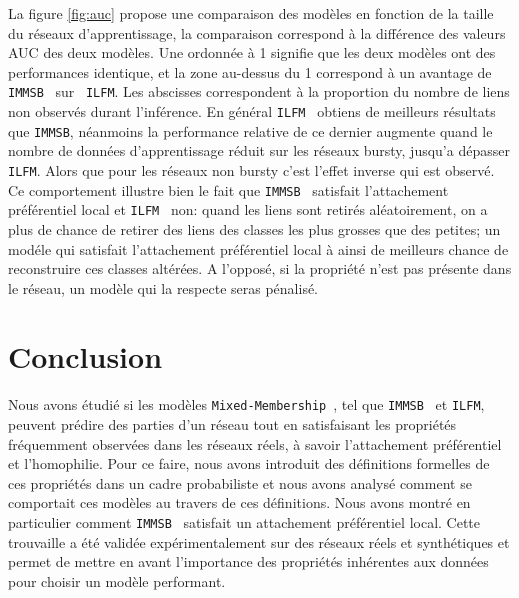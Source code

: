 \documentclass[french]{hermes-journal}
\newcommand{\ilfm}{\texttt{ILFM}}
\newcommand{\immsb}{\texttt{IMMSB}}
\newcommand{\mmm}{\texttt{Mixed-Membership}~}
\begin{document}
La figure \ref{fig:auc} propose une comparaison des modèles en fonction de la taille du réseaux d'apprentissage, la comparaison correspond à la différence des valeurs AUC des deux modèles. Une ordonnée à 1 signifie que les deux modèles ont des performances identique, et la zone au-dessus du 1 correspond à un avantage de \immsb~ sur ~\ilfm. Les abscisses correspondent à la proportion du nombre de liens non observés durant l'inférence. En général \ilfm~ obtiens de meilleurs résultats que \immsb, néanmoins la performance relative de ce dernier augmente quand le nombre de données d'apprentissage réduit sur les réseaux bursty, jusqu'a dépasser \ilfm. Alors que pour les réseaux non bursty c'est l'effet inverse qui est observé. Ce comportement illustre bien le fait que \immsb~ satisfait l'attachement préférentiel local et \ilfm~ non: quand les liens sont retirés aléatoirement, on a plus de chance de retirer des liens des classes les plus grosses que des petites; un modéle qui satisfait l'attachement préférentiel local à ainsi de meilleurs chance de reconstruire ces classes altérées. A l'opposé, si la propriété n'est pas présente dans le réseau, un modèle qui la respecte seras pénalisé.

\section{Conclusion}

Nous avons étudié si les modèles \mmm, tel que \immsb~ et \ilfm, peuvent prédire des parties d'un réseau tout en satisfaisant les propriétés fréquemment observées dans les réseaux réels, à savoir l'attachement préférentiel et l'homophilie. Pour ce faire, nous avons introduit des définitions formelles de ces propriétés dans un cadre probabiliste et nous avons analysé comment se comportait ces modèles au travers de ces définitions. Nous avons montré en particulier comment \immsb~ satisfait un attachement préférentiel local. Cette trouvaille a été validée expérimentalement sur des réseaux réels et synthétiques et permet de mettre en avant l'importance des propriétés inhérentes aux données pour choisir un modèle performant.













%

\end{document}

